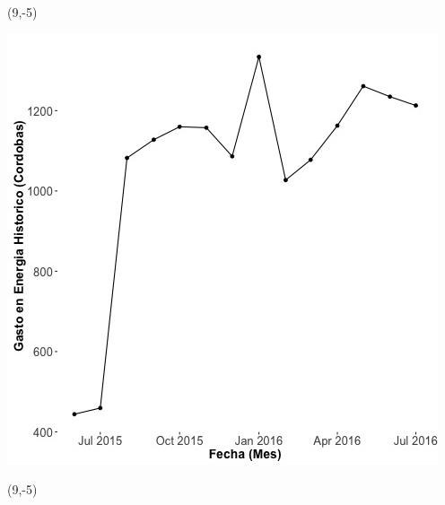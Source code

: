 \documentclass{article}\usepackage[]{graphicx}\usepackage[]{color}
\newenvironment{knitrout}{}{} %
\begin{document}
 \begin{textblock}{1}(9,-5)
\begin{minipage}{20em}
\begingroup

\endgroup
\end{minipage}
\end{textblock}

\begin{knitrout}
\color{fgcolor}
\includegraphics[scale=0.65]{figure/A9_historico_cordobas} 
\end{knitrout}

 \begin{textblock}{1}(9,-5)
\begin{minipage}{20em}
\begingroup

\endgroup
\end{minipage}
\end{textblock}
\end{document}
